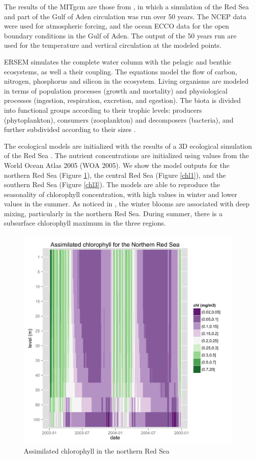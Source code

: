 The results of the MITgcm are those from \citet{Yao2014, Yao2014b}, in which a
simulation of the Red Sea and part of the Gulf of Aden circulation was run over
50 years. The NCEP data were used for atmospheric forcing, and the ocean ECCO
data for the open boundary conditions in the Gulf of Aden. The output of the 50
years run are used for the temperature and vertical circulation at the modeled
points.

ERSEM simulates the complete water column with the pelagic and benthic
ecosystems, as well a their coupling. The equations model the flow of carbon,
nitrogen, phosphorus and silicon in the ecosystem. Living organisms are modeled
in terms of population processes (growth and mortality) and physiological
processes (ingestion, respiration, excretion, and egestion). The biota is
divided into functional groups according to their trophic levels: producers
(phytoplankton), consumers (zooplankton) and decomposers (bacteria), and
further subdivided according to their sizes \citep{Baretta1995}.

The ecological models are initialized with the results of a 3D ecological
simulation of the Red Sea \citep{Triantafyllou2014}. The nutrient
concentrations are initialized using values from the World Ocean Atlas 2005
(WOA 2005). We show the model outputs for the northern Red Sea (Figure
\ref{chl2}), the central Red Sea (Figure \ref{chl1}), and the southern Red Sea
(Figure \ref{chl3}). The models are able to reproduce the seasonality of
chlorophyll concentration, with high values in winter and lower values in the
summer. As noticed in \citet{Raitsos2013}, the winter blooms are associated
with deep mixing, particularly in the northern Red Sea.  During summer, there
is a subsurface chlorophyll maximum in the three regions.

\begin{figure}
    \centering
    \includegraphics[scale=.13]{figures/chl2.png}
    \caption{Assimilated chlorophyll in the northern Red Sea}
    \label{chl2}
\end{figure}

